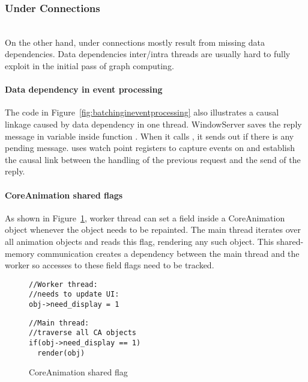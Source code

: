 \subsubsection{Under Connections}\hfill\\
On the other hand, under connections mostly result from missing data
dependencies. Data dependencies inter/intra threads are usually hard to fully
exploit in the initial pass of graph computing.

\paragraph{Data dependency in event processing}
The code in Figure~\ref{fig:batchingineventprocessing} also illustrates a causal
linkage caused by data dependency in one thread. WindowServer saves the reply
message in variable  inside function .
When it calls , it sends out  if there
is any pending message. \xxx uses watch point registers to capture events
on  and establish the causal link between the handling of the
previous request and the send of the reply.

\paragraph{CoreAnimation shared flags}
As shown in Figure~\ref{fig:casharedflag}, worker thread can set
a field  inside a CoreAnimation
object whenever the object needs to be repainted. The main thread iterates over
all animation objects and reads this flag, rendering any such object. This
shared-memory communication creates a dependency between the main thread and the
worker so accesses to these field flags need to be tracked.

\begin{figure}[ht!]
\begin{minipage}[t]{.20\textwidth}
\begin{lstlisting}
//Worker thread:
//needs to update UI:
obj->need_display = 1
\end{lstlisting}\hfill
\end{minipage}
\noindent\begin{minipage}[t]{.28\textwidth}
\begin{lstlisting}
//Main thread: 
//traverse all CA objects
if(obj->need_display == 1)
  render(obj)
\end{lstlisting}\hfill
\end{minipage}
    \caption{CoreAnimation shared flag}
    \label{fig:casharedflag}
\end{figure}

